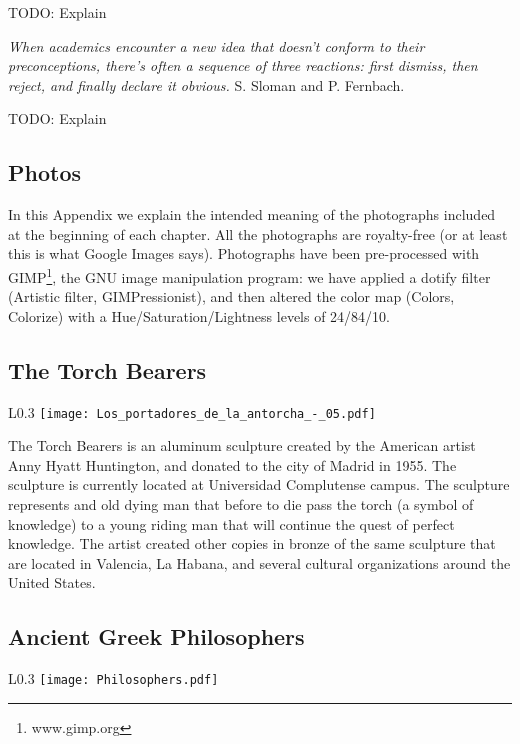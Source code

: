{\color{red} TODO: Explain}

\bigskip

\emph{When academics encounter a new idea that doesn’t conform to their preconceptions, there’s often a sequence of three reactions: first dismiss, then reject, and finally declare it obvious.} S. Sloman and P. Fernbach.

{\color{red} TODO: Explain}

%
%

\subsection{Photos}

In this Appendix we explain the intended meaning of the photographs included at the beginning of each chapter. All the photographs are royalty-free (or at least this is what Google Images says). Photographs have been pre-processed with GIMP\footnote {www.gimp.org}, the GNU image manipulation program: we have applied a dotify filter (Artistic filter, GIMPressionist), and then altered the color map (Colors, Colorize) with a Hue/Saturation/Lightness levels of 24/84/10.

\subsection* {The Torch Bearers}

\begin{wrapfigure}{L}{0.3\textwidth}
\centering
\texttt{[image: Los\_portadores\_de\_la\_antorcha\_-\_05.pdf]}
\end{wrapfigure}

The Torch Bearers is an aluminum sculpture created by the American artist Anny Hyatt Huntington, and donated to the city of Madrid in 1955. The sculpture is currently located at Universidad Complutense campus. The sculpture represents and old dying man that before to die pass the torch (a symbol of knowledge) to a young riding man that will continue the quest of perfect knowledge. The artist created other copies in bronze of the same sculpture that are located in Valencia, La Habana, and several cultural organizations around the United States.

\subsection* {Ancient Greek Philosophers}

\begin{wrapfigure}{L}{0.3\textwidth}
\centering
\texttt{[image: Philosophers.pdf]}
\end{wrapfigure}


